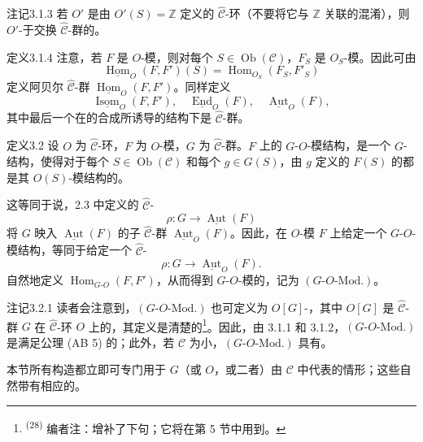 \begin{SGAresult}{注记}{3.1.3}
若 $O'$ 是由 $O'(S)=\mathbb Z$ 定义的 $\widehat{\mathcal C}$-环（不要将它与 $\mathbb Z$ 关联的混淆），则 $O'$-于交换 $\widehat{\mathcal C}$-群的。
\end{SGAresult}
\begin{SGAresult}{定义}{3.1.4}
注意，若 $F$ 是 $O$-模，则对每个 $S\in\operatorname{Ob}(\mathcal C)$，$F_S$ 是 $O_S$-模。因此可由
\[
\underline{\operatorname{Hom}}_O(F,F')(S)=\operatorname{Hom}_{O_S}(F_S,F'_S)
\]
定义阿贝尔 $\widehat{\mathcal C}$-群 $\underline{\operatorname{Hom}}_O(F,F')$。同样定义
\[
\underline{\operatorname{Isom}}_O(F,F'),\quad\underline{\operatorname{End}}_O(F),\quad\underline{\operatorname{Aut}}_O(F),
\]
其中最后一个在的合成所诱导的结构下是 $\widehat{\mathcal C}$-群。
\end{SGAresult}
\begin{SGAresult}{定义}{3.2}
设 $O$ 为 $\widehat{\mathcal C}$-环，$F$ 为 $O$-模，$G$ 为 $\widehat{\mathcal C}$-群。$F$ 上的 $G$-$O$-模结构，是一个 $G$-结构，使得对于每个 $S\in\operatorname{Ob}(\mathcal C)$ 和每个 $g\in G(S)$，由 $g$ 定义的 $F(S)$ 的都是其 $O(S)$-模结构的。
\end{SGAresult}
这等同于说，2.3 中定义的 $\widehat{\mathcal C}$-
\[
\rho:G\longrightarrow\underline{\operatorname{Aut}}(F)
\]
将 $G$ 映入 $\underline{\operatorname{Aut}}(F)$ 的子 $\widehat{\mathcal C}$-群 $\underline{\operatorname{Aut}}_O(F)$。因此，在 $O$-模 $F$ 上给定一个 $G$-$O$-模结构，等同于给定一个 $\widehat{\mathcal C}$-
\[
\rho:G\longrightarrow\underline{\operatorname{Aut}}_O(F).
\]
自然地定义 $\operatorname{Hom}_{G\text{-}O}(F,F')$，从而得到 $G$-$O$-模的，记为 $(G\text{-}O\text{-}\mathrm{Mod.})$。

\begin{SGAresult}{注记}{3.2.1}
读者会注意到，$(G\text{-}O\text{-}\mathrm{Mod.})$ 也可定义为 $O[G]$-，其中 $O[G]$ 是 $\widehat{\mathcal C}$-群 $G$ 在 $\widehat{\mathcal C}$-环 $O$ 上的，其定义是清楚的\footnote{\textsuperscript{(28)} 编者注：增补了下句；它将在第 5 节中用到。}。因此，由 3.1.1 和 3.1.2，$(G\text{-}O\text{-}\mathrm{Mod.})$ 是满足公理 (AB 5) 的；此外，若 $\mathcal C$ 为小，$(G\text{-}O\text{-}\mathrm{Mod.})$ 具有。
\end{SGAresult}
本节所有构造都立即可专门用于 $G$（或 $O$，或二者）由 $\mathcal C$ 中代表的情形；这些自然带有相应的。

